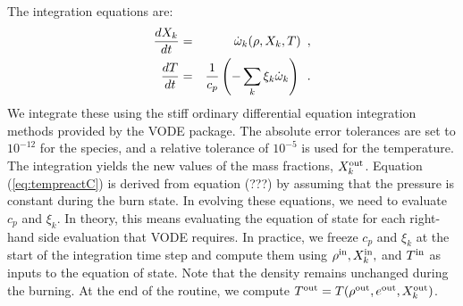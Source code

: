 \documentclass[11pt]{book}
\def\omegadot {\dot\omega}
\def\inp  {{\rm in}}
\def\outp {{\rm out}}
\begin{document}
The integration equations are:
\begin{eqnarray}
\frac{dX_k}{dt} &=& \omegadot_k(\rho,X_k,T)\enskip, \label{eq:VODE1C} \\
\frac{dT}{dt} &=&\frac{1}{c_p} \left ( -\sum_k \xi_k  \omegadot_k  \right )\enskip. \label{eq:tempreactC}
\end{eqnarray}
We integrate these using the stiff ordinary differential equation integration methods
provided by the VODE package.  The absolute error tolerances are set
to $10^{-12}$ for the species, and a relative tolerance of $10^{-5}$
is used for the temperature.  The integration yields the new values of
the mass fractions, $X_k^\outp$.  Equation (\ref{eq:tempreactC}) is
derived from equation (???) by assuming that the pressure is constant
during the burn state.  In evolving these equations, we need to
evaluate $c_p$ and $\xi_k$.  In theory, this means evaluating the
equation of state for each right-hand side evaluation that VODE
requires.  In practice, we freeze $c_p$ and $\xi_k$ at the start of
the integration time step and compute them using $\rho^\inp,
X_k^\inp,$ and $T^\inp$ as inputs to the equation of state.  Note that
the density remains unchanged during the burning.  At the end of the
routine, we compute $T^\outp = T(\rho^\outp,e^{\outp},X_k^\outp)$.

\backmatter

\renewcommand\bibname{References}


\end{document}
